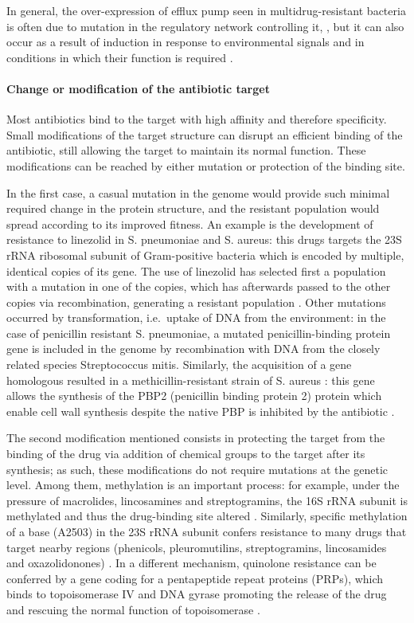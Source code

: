 In general, the over-expression of efflux pump seen in multidrug-resistant bacteria is often due to mutation in the regulatory network controlling it, \cite{Abouzeed2008}, but it can also occur as a result of induction in response to environmental signals and in conditions in which their function is required \cite{Baucheron2014,Nikaido2011,Hirakawa2004}.


\paragraph{Change or modification of the antibiotic target}
Most antibiotics bind to the target with high affinity and therefore specificity. Small modifications of the target structure can disrupt an efficient binding of the antibiotic, still allowing the target to maintain its normal function. These modifications can be reached by either mutation or protection of the binding site.

In the first case, a casual mutation in  the genome would provide such minimal required change in the protein structure, and the resistant population would spread according to its improved fitness.
%
An example is the development of resistance to linezolid in S. pneumoniae and S. aureus: this drugs targets the 23S rRNA ribosomal subunit of Gram-positive bacteria which is encoded by multiple, identical copies of its gene. The use of linezolid has selected first a population with a mutation in one of the copies, which has afterwards passed to the other copies via recombination, generating a resistant population \cite{Billal2011,Gao2010}.
%
Other mutations occurred by transformation, i.e.\ uptake of DNA from the environment: in the case of penicillin resistant S. pneumoniae, a mutated penicillin-binding protein gene is included in the genome by recombination with DNA from the closely related species Streptococcus mitis. Similarly, the acquisition of a gene homologous resulted in a methicillin-resistant strain of S. aureus \cite{Shore2011}: this gene allows the synthesis of the PBP2 (penicillin binding protein 2) protein which enable cell wall synthesis despite the native PBP is inhibited by the antibiotic \cite{Katayama2000}.

The second modification mentioned consists in protecting the target from the binding of the drug via addition of chemical groups to the target after its synthesis; as such, these modifications do not require mutations at the genetic level.
%
Among them, methylation is an important process: for example, under the pressure of macrolides, lincosamines and streptogramins, the 16S rRNA subunit is methylated and thus the drug-binding site altered \cite{Kumar2014}. Similarly, specific methylation of a base (A2503) in the 23S rRNA subunit confers resistance to many drugs that target nearby regions (phenicols, pleuromutilins, streptogramins, lincosamides and oxazolidonones) \cite{Long2006}.
%
In a different mechanism, quinolone resistance can be conferred by a gene coding for a pentapeptide repeat proteins (PRPs), which binds to topoisomerase IV and DNA gyrase promoting the release of the drug and rescuing the normal function of topoisomerase \cite{Vetting2011}.

